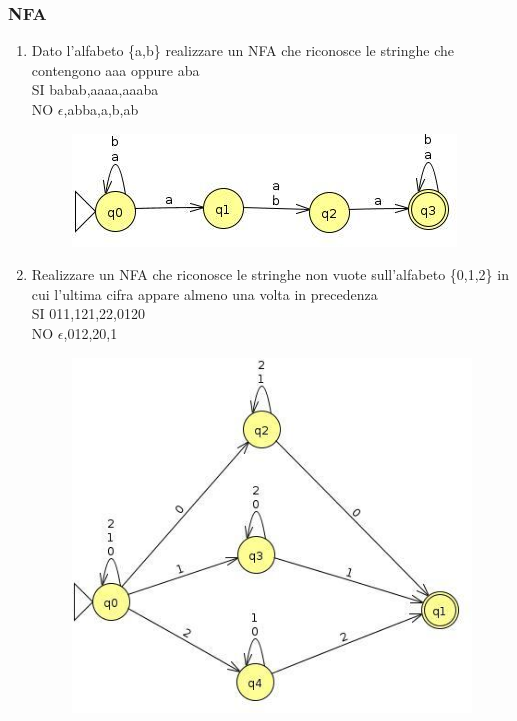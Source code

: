 \subsubsection{NFA}
\begin{enumerate}
  \item 
    Dato l'alfabeto \{a,b\} realizzare un NFA che riconosce le stringhe che 
    contengono aaa oppure aba
    \\
    SI babab,aaaa,aaaba
    \\
    NO $\epsilon$,abba,a,b,ab

\begin{figure}[h]
  \includegraphics[scale = 0.5]{media/es8.jpg}
  \centering
\end{figure}

  \item Realizzare un NFA che riconosce le stringhe non vuote sull'alfabeto \{0,1,2\} in cui l'ultima cifra appare almeno una volta in precedenza
    \\
    SI 011,121,22,0120
    \\
    NO $\epsilon$,012,20,1

\begin{figure}[h]
  \includegraphics[scale = 0.5]{media/es9.jpg}
  \centering
\end{figure}


\end{enumerate}
